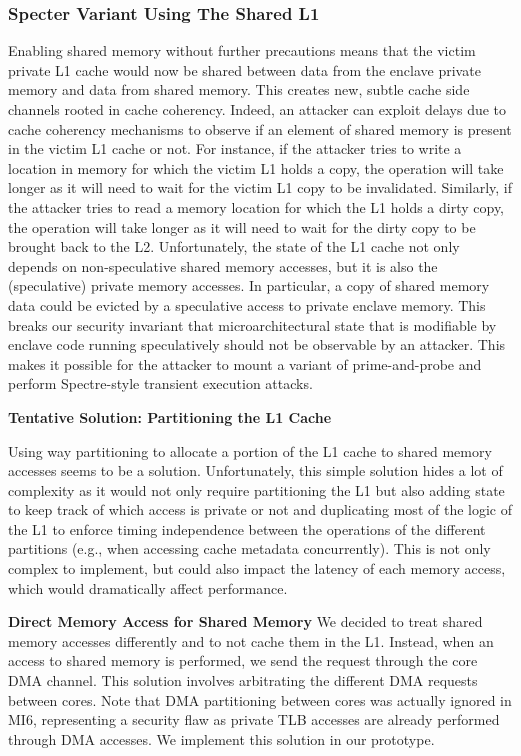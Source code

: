 \subsubsection{Specter Variant Using The Shared L1}
Enabling shared memory without further precautions means that the victim private L1 cache would now be shared between data from the enclave private memory and data from shared memory.
This creates new, subtle cache side channels rooted in cache coherency.
Indeed, an attacker can exploit delays due to cache coherency mechanisms to observe if an element of shared memory is present in the victim L1 cache or not.
For instance, if the attacker tries to write a location in memory for which the victim L1 holds a copy, the operation will take longer as it will need to wait for the victim L1 copy to be invalidated.
Similarly, if the attacker tries to read a memory location for which the L1 holds a dirty copy, the operation will take longer as it will need to wait for the dirty copy to be brought back to the L2.
Unfortunately, the state of the L1 cache not only depends on non-speculative shared memory accesses, but it is also the (speculative) private memory accesses.
In particular, a copy of shared memory data could be evicted by a speculative access to private enclave memory.
This breaks our security invariant that microarchitectural state that is modifiable by enclave code running speculatively should not be observable by an attacker.
This makes it possible for the attacker to mount a variant of prime-and-probe and perform Spectre-style transient execution attacks.

\textbf{Tentative Solution: Partitioning the L1 Cache}

Using way partitioning to allocate a portion of the L1 cache to shared memory accesses seems to be a solution.
Unfortunately, this simple solution hides a lot of complexity as it would not only require partitioning the L1 but also adding state to keep track of which access is private or not and duplicating most of the logic of the L1 to enforce timing independence between the operations of the different partitions (e.g., when accessing cache metadata concurrently).
This is not only complex to implement, but could also impact the latency of each memory access, which would dramatically affect performance.

\textbf{Direct Memory Access for Shared Memory}
We decided to treat shared memory accesses differently and to not cache them in the L1.
Instead, when an access to shared memory is performed, we send the request through the core DMA channel. 
This solution involves arbitrating the different DMA requests between cores.
Note that DMA partitioning between cores was actually ignored in MI6, representing a security flaw as private TLB accesses are already performed through DMA accesses.
We implement this solution in our prototype.